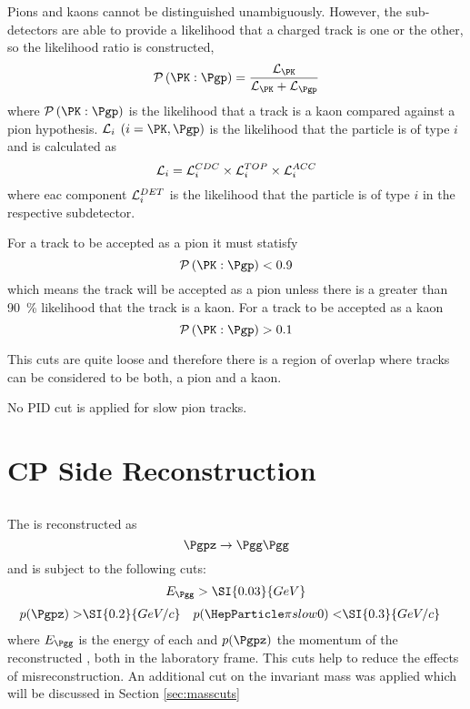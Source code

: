 \documentclass[a4paper]{report}
\begin{document}
Pions and kaons cannot be distinguished unambiguously. However, the
sub-detectors are able to provide a likelihood that a charged track is one or
the other, so the likelihood ratio is constructed,
\[
\mathcal{P}\left( \PK : \Pgp \right) =
\frac{\LH_{\PK}}{\LH_{\PK} +
\LH_{\Pgp}}
\]
where $\mathcal{P}\left( \PK : \Pgp \right)$ is the likelihood that a track is a
kaon compared against a pion hypothesis. $\mathcal{L}_i$ $(i = \PK, \Pgp)$ is
the likelihood that the particle is of type $i$ and is calculated as
\[ \mathcal{L}_i = \mathcal{L}_i^{CDC} \times \mathcal{L}_i^{TOP} \times \mathcal{L}_i^{ACC} \]
where eac component $\mathcal{L}_i^{DET}$ is the likelihood that the particle is of type
$i$ in the respective subdetector.


For a track to be accepted as a pion it must statisfy
\[ \mathcal{P}\left( \PK : \Pgp \right) < 0.9 \]
which means the track will be accepted as a pion unless there is a greater than
\SI{90}{\%} likelihood that the track is a kaon. For a track to be accepted as a
kaon
\[ \mathcal{P}\left( \PK : \Pgp \right) > 0.1 \]

This cuts are quite loose and therefore there is a region of overlap where
tracks can be considered to be both, a pion and a kaon.

No PID cut is applied for slow pion tracks.

\section{CP Side Reconstruction}

\subsection{\texorpdfstring{\Pgpz}{pi0}}
The \Pgpz is reconstructed as
\[\Pgpz \rightarrow \Pgg\Pgg\]
and is subject to the following cuts:
\[ E_{\Pgg} > \SI{0.03}{GeV} \]
\begin{align*}
    p(\Pgpz) >& \SI{0.2}{GeV/c}&
    p(\Pgpzs)<& \SI{0.3}{GeV/c}
\end{align*}
where $E_{\Pgg}$ is the energy of each \Pgg  and $p(\Pgpz)$ the momentum of the
reconstructed \Pgpz, both in the laboratory frame. This cuts help to reduce the
effects of misreconstruction. An additional cut on the invariant mass was
applied which will be discussed in Section \ref{sec:masscuts}

\subsection{\texorpdfstring{\PKzS}{K0S}}
\end{document}

